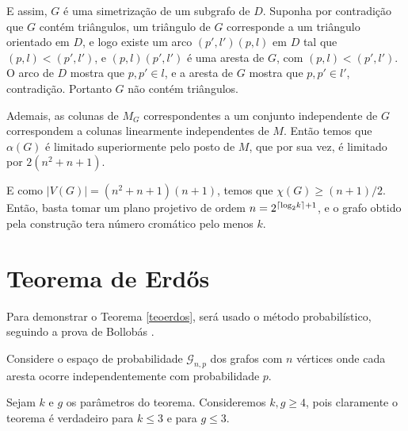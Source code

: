 E assim, $G$ é uma simetrização de um subgrafo de $D$. Suponha por contradição que $G$ contém triângulos, um triângulo de $G$ corresponde a um triângulo orientado em $D$, e logo existe um arco $(p',l')(p,l)$ em $D$ tal que $(p,l) < (p',l')$, e $(p,l)(p',l')$ é uma aresta de $G$, com $(p,l) < (p',l')$. O arco de $D$ mostra que $p,p' \in l$, e a aresta de $G$ mostra que $p,p' \in l'$, contradição. Portanto $G$ não contém triângulos.

Ademais, as colunas de $M_G$ correspondentes a um conjunto independente de $G$ correspondem a colunas linearmente independentes de $M$. Então temos que $\alpha(G)$ é limitado superiormente pelo posto de $M$, que por sua vez, é limitado por $2(n^2+n+1)$.

E como $|V(G)| = (n^2+n+1)(n+1)$, temos que $\chi(G) \geq (n+1)/2$. Então, basta tomar um plano projetivo de ordem $n = 2^{\ceil*{\text{log}_2 k}+1}$, e o grafo obtido pela construção tera número cromático pelo menos $k$.





\section{Teorema de Erd\H{o}s}

Para demonstrar o Teorema \ref{teoerdos}, será usado o método probabilístico, seguindo a prova de Bollobás \cite{bollobas2013modern}.

Considere o espaço de probabilidade $\mathcal{G}_{n,p}$ dos grafos com $n$ vértices onde cada aresta ocorre independentemente com probabilidade $p$.

Sejam $k$ e $g$ os parâmetros do teorema. Consideremos $k,g \geq 4$, pois claramente o teorema é verdadeiro para $k \leq 3$ e para $g \leq 3$. 

